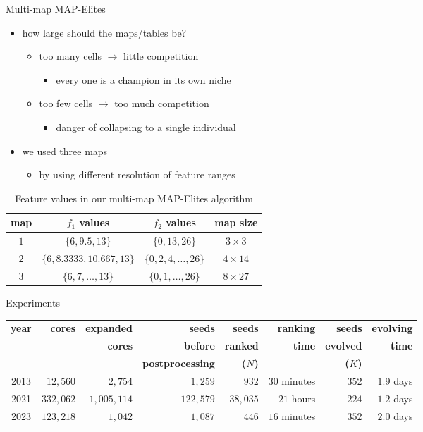 \documentclass[aspectratio=169,usenames,dvipsnames]{beamer}
\newcommand{\bei}{\begin{itemize}}
\newcommand{\eei}{\end{itemize}}
\newcommand{\ie}{\item}
\numberwithin{equation}{section}
\numberwithin{theorem}{section}
\numberwithin{lem}{section}
\numberwithin{df}{section}
\begin{document}
\begin{frame}{Multi-map MAP-Elites}

\bei

\ie how large should the maps/tables be?
\bei
\ie too many cells $\to$ little competition
\bei
\ie every one is a champion in its own niche
\eei

\ie too few cells $\to$ too much competition
\bei
\ie danger of collapsing to a single individual
\eei
\eei

\bigskip

\ie we used three maps
\bei
\ie by using different resolution of feature ranges
\eei

\eei

\begin{table}
{\small\centering
\begin{tabular}{c|c|c|c}
\toprule
{\bf map} & {\bf $f_1$ values} & {\bf $f_2$ values} & {\bf map size} \\
\midrule
$1$ & $\{6,9.5,13\}$ & $\{0,13,26\}$ & $3 \times 3$ \\
$2$ & $\{6,8.3333,10.667,13\}$ & $\{0,2,4,\dots,26\}$ & $4 \times 14$\\
$3$ & $\{6,7,\dots,13\}$ & $\{0,1,\dots,26\}$ & $8 \times 27$\\
\bottomrule
\end{tabular}}
\caption{Feature values in our multi-map MAP-Elites algorithm}
\label{tab:mrme}
\end{table}

\end{frame}



\begin{frame}{Experiments}

\begin{table}[htbp]
{\footnotesize\centering
\begin{tabular}{c|r|r|r|r|r|r|r}
\toprule
{\bf year} & {\bf cores} & {\bf expanded} & {\bf seeds} & {\bf seeds} & {\bf ranking} & {\bf seeds} & {\bf evolving}\\
           & & {\bf cores} & {\bf before} & {\bf ranked} & {\bf time} & {\bf evolved} & {\bf time} \\
           & & & {\bf postprocessing} & {\bf ($N$)} & & {\bf ($K$)} & \\
\midrule
2013 & $12,\!560$ & $2,\!754$ & $1,\!259$ & $932$ & $30$ minutes & $352$ & $1.9$ days \\ 
2021 & $332,\!062$ & $1,\!005,\!114$ & $122,\!579$ & $38,\!035$ & $21$ hours & $224$ & $1.2$ days \\ 
2023 & $123,\!218$ & $1,\!042$ & $1,\!087$ & $446$ & $16$ minutes & $352$ & $2.0$ days \\ 
\bottomrule
\end{tabular}}
\end{table}


\end{frame}
\end{document}
